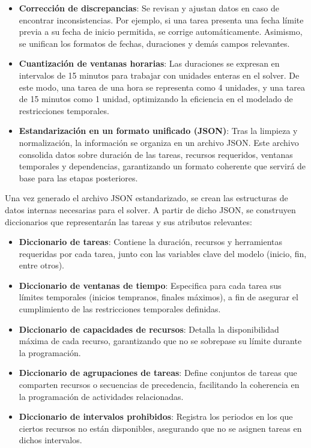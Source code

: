 \documentclass{article}
\begin{document}
\begin{itemize}
    \item \textbf{Corrección de discrepancias}: Se revisan y ajustan datos en caso de encontrar inconsistencias. Por ejemplo, si una tarea presenta una fecha límite previa a su fecha de inicio permitida, se corrige automáticamente. Asimismo, se unifican los formatos de fechas, duraciones y demás campos relevantes.

    \item \textbf{Cuantización de ventanas horarias}: Las duraciones se expresan en intervalos de 15 minutos para trabajar con unidades enteras en el solver. De este modo, una tarea de una hora se representa como 4 unidades, y una tarea de 15 minutos como 1 unidad, optimizando la eficiencia en el modelado de restricciones temporales.

    \item \textbf{Estandarización en un formato unificado (JSON)}: Tras la limpieza y normalización, la información se organiza en un archivo JSON. Este archivo consolida datos sobre duración de las tareas, recursos requeridos, ventanas temporales y dependencias, garantizando un formato coherente que servirá de base para las etapas posteriores.

\end{itemize}

Una vez generado el archivo JSON estandarizado, se crean las estructuras de datos internas necesarias para el solver. A partir de dicho JSON, se construyen diccionarios que representarán las tareas y sus atributos relevantes:

\begin{itemize}
    \item \textbf{Diccionario de tareas}: Contiene la duración, recursos y herramientas requeridas por cada tarea, junto con las variables clave del modelo (inicio, fin, entre otros).

    \item \textbf{Diccionario de ventanas de tiempo}: Especifica para cada tarea sus límites temporales (inicios tempranos, finales máximos), a fin de asegurar el cumplimiento de las restricciones temporales definidas.

    \item \textbf{Diccionario de capacidades de recursos}: Detalla la disponibilidad máxima de cada recurso, garantizando que no se sobrepase su límite durante la programación.

    \item \textbf{Diccionario de agrupaciones de tareas}: Define conjuntos de tareas que comparten recursos o secuencias de precedencia, facilitando la coherencia en la programación de actividades relacionadas.

    \item \textbf{Diccionario de intervalos prohibidos}: Registra los periodos en los que ciertos recursos no están disponibles, asegurando que no se asignen tareas en dichos intervalos.

\end{itemize}
\end{document}
